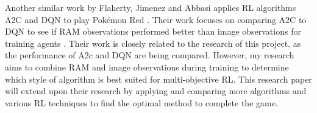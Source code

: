 Another similar work by Flaherty, Jimenez and Abbasi applies RL algorithms A2C and DQN to play Pokémon Red  \cite{flaherty2021playing}. Their work focuses on comparing A2C to DQN to see if RAM observations performed better than image observations for training agents \cite{flaherty2021playing}. Their work is  closely related to the research of this project, as the performance of A2c and DQN are being compared. However, my research aims to combine RAM and image observations during training to determine which style of algorithm is best suited for multi-objective RL. This research paper will extend upon their research by applying and comparing more algorithms and various RL techniques to find the optimal method to complete the game.

